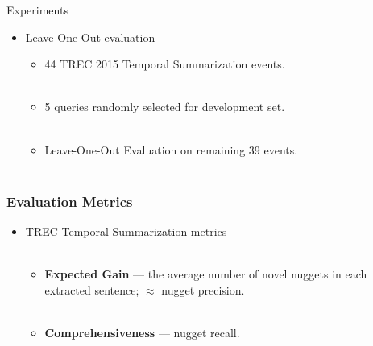 \begin{frame}{Experiments}

    \begin{itemize}
    \item Leave-One-Out evaluation
        \begin{itemize}
            \item 44 TREC 2015 Temporal Summarization events.\\~\\
            \item 5 queries randomly selected for development set.\\~\\
            \item Leave-One-Out Evaluation on remaining 39 events.\\~\\
        \end{itemize}
    \end{itemize}


\end{frame}
\begin{frame}
    \frametitle{Evaluation Metrics}
    \begin{itemize}
    \item TREC Temporal Summarization metrics~\\~\\
        \begin{itemize}
            \item  \textbf{Expected Gain} --- the average number of novel nuggets in 
                each extracted sentence; $\approx$ nugget precision. ~\\~\\
            \item \textbf{Comprehensiveness} --- nugget recall.
        \end{itemize}
    \end{itemize}
\end{frame}


